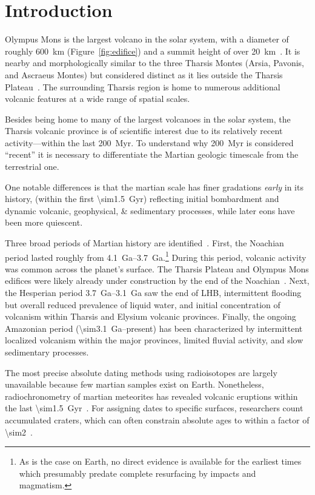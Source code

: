 \chapter{Introduction}

Olympus Mons is the largest volcano in the solar system, with a diameter of roughly \qty{600}{\km} (Figure~\ref{fig:edifice}) and a summit height of over \qty{20}{\km}~\parencite{plescia_morphometric_2004}. It is nearby and morphologically similar to the three Tharsis Montes (Arsia, Pavonis, and Ascraeus Montes) but considered distinct as it lies outside the Tharsis Plateau~\parencite{bleacher_trends_2007}. The surrounding Tharsis region is home to numerous additional volcanic features at a wide range of spatial scales.

Besides being home to many of the largest volcanoes in the solar system, the Tharsis volcanic province is of scientific interest due to its relatively recent activity---within the last \qty{200}{Myr}. To understand why \qty{200}{Myr} is considered ``recent'' it is necessary to differentiate the Martian geologic timescale from the terrestrial one.

One notable differences is that the martian scale has finer gradations \textit{early} in its history, (within the first \qty{\sim1.5}{Gyr}) reflecting initial bombardment and dynamic volcanic, geophysical, \& sedimentary processes, while later eons have been more quiescent. 

Three broad periods of Martian history are identified~\parencite{carr_geologic_2010}. First, the Noachian period lasted roughly from \qtyrange{4.1}{3.7}{Ga}.\footnote{As is the case on Earth, no direct evidence is available for the earliest times which presumably predate complete resurfacing by impacts and magmatism.} During this period, volcanic activity was common across the planet's surface. The Tharsis Plateau and Olympus Mons edifices were likely already under construction by the end of the Noachian~\parencite{isherwood_volcanic_2013}. Next, the Hesperian period \qtyrange{3.7}{3.1}{Ga} saw the end of \ac{LHB}, intermittent flooding but overall reduced prevalence of liquid water, and initial concentration of volcanism within Tharsis and Elysium volcanic provinces. Finally, the ongoing Amazonian period (\qty{\sim3.1}{Ga}--present) has been characterized by intermittent localized volcanism within the major provinces, limited fluvial activity, and slow sedimentary processes.

The most precise absolute dating methods using radioisotopes are largely unavailable because few martian samples exist on Earth. Nonetheless, radiochronometry of martian meteorites has revealed volcanic eruptions within the last \qty{\sim1.5}{Gyr}~\parencite[e.g.,][]{cohen_taking_2017}. For assigning dates to specific surfaces, researchers count accumulated craters, which can often constrain absolute ages to within a factor of \num{\sim2}~\parencite[e.g.,][]{kneissl_map-projection-independent_2011}.

